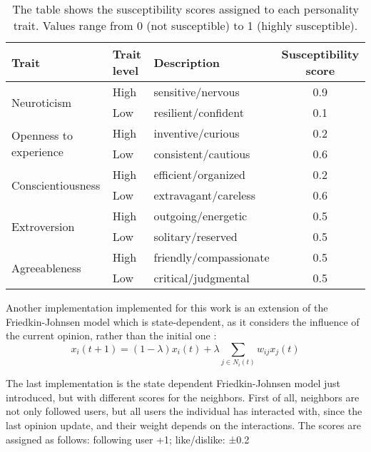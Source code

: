 \begin{table}[h]
\centering
\begin{tabular}{|l|l|l|c|}
\hline
\textbf{Trait} & \textbf{Trait level} & \textbf{Description} & \textbf{Susceptibility score} \\
\hline
\multirow{2}{*}{Neuroticism}       
  & High & sensitive/nervous         & 0.9 \\
  & Low & resilient/confident        & 0.1 \\
\hline
\multirow{2}{*}{Openness to experience}          
  & High & inventive/curious         & 0.2 \\
  & Low & consistent/cautious        & 0.6 \\
\hline
\multirow{2}{*}{Conscientiousness} 
  & High & efficient/organized       & 0.2 \\
  & Low & extravagant/careless       & 0.6 \\
\hline
\multirow{2}{*}{Extroversion}      
  & High & outgoing/energetic        & 0.5 \\
  & Low & solitary/reserved          & 0.5 \\
\hline
\multirow{2}{*}{Agreeableness}     
  & High & friendly/compassionate    & 0.5 \\
  & Low & critical/judgmental        & 0.5 \\
\hline
\end{tabular}
\caption{The table shows the susceptibility scores assigned to each personality trait. Values range from 0 (not susceptible) to 1 (highly susceptible).}
\label{tab:susceptibility}
\end{table}

Another implementation implemented for this work is an extension of the Friedkin-Johnsen model which is state-dependent, as it considers the influence of the current opinion, rather than the initial one \cite{Ye2018Opinion}:
\[
x_i(t + 1) = (1 - \lambda) x_i(t) + \lambda  \sum_{j \in N_i(t)} w_{ij} x_j (t)
\]

The last implementation is the state dependent Friedkin-Johnsen model just introduced, but with different scores for the neighbors. 
First of all, neighbors are not only followed users, but all users the individual has interacted with, since the last opinion update, and their weight depends on the interactions. 
The scores are assigned as follows: following user +1; like/dislike: ±0.2




